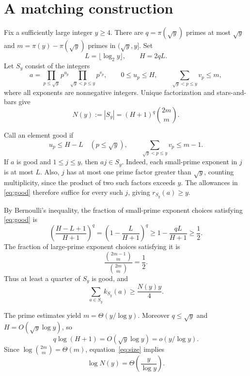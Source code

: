 \documentclass[11pt,a4paper]{article}
\begin{document}
\newpage
\section{A matching construction}

Fix a sufficiently large integer $y\ge4$.
There are $q=\pi(\sqrt y)$ primes at most $\sqrt y$ and $m=\pi(y)-\pi(\sqrt y)$ primes in $(\sqrt y,y]$.
Set
\[
L=\lfloor\log_2 y\rfloor,\qquad H=2qL.
\]
Let $S_y$ consist of the integers
\begin{equation}\label{eq:construction}
a=\prod_{p\le\sqrt y}p^{u_p}\prod_{\sqrt y<p\le y}p^{v_p},
\qquad
0\le u_p\le H,\qquad
\sum_{\sqrt y<p\le y}v_p\le m,
\end{equation}
where all exponents are nonnegative integers.
Unique factorization and stars-and-bars give
\begin{equation}\label{eq:size}
N(y):=|S_y|=(H+1)^q\binom{2m}{m}.
\end{equation}

Call an element good if
\begin{equation}\label{eq:good}
u_p\le H-L\quad(p\le\sqrt y),
\qquad
\sum_{\sqrt y<p\le y}v_p\le m-1.
\end{equation}
If $a$ is good and $1\le j\le y$, then $aj\in S_y$.
Indeed, each small-prime exponent in $j$ is at most $L$.
Also, $j$ has at most one prime factor greater than $\sqrt y$, counting multiplicity, since the product of two such factors exceeds $y$.
The allowances in \eqref{eq:good} therefore suffice for every such $j$, giving $r_{S_y}(a)\ge y$.

By Bernoulli's inequality, the fraction of small-prime exponent choices satisfying \eqref{eq:good} is
\[
\left(\frac{H-L+1}{H+1}\right)^q
=\left(1-\frac{L}{H+1}\right)^q
\ge1-\frac{qL}{H+1}\ge\frac12.
\]
The fraction of large-prime exponent choices satisfying it is
\[
\frac{\binom{2m-1}{m}}{\binom{2m}{m}}=\frac12.
\]
Thus at least a quarter of $S_y$ is good, and
\begin{equation}\label{eq:lower-y}
\sum_{a\in S_y}k_{S_y}(a)\ge\frac{N(y)y}{4}.
\end{equation}

The prime estimates yield $m=\Theta(y/\log y)$.
Moreover $q\le\sqrt y$ and $H=O(\sqrt y\log y)$, so
\[
q\log(H+1)=O(\sqrt y\log y)=o(y/\log y).
\]
Since $\log\binom{2m}{m}=\Theta(m)$, equation~\eqref{eq:size} implies
\begin{equation}\label{eq:asymptotic-size}
\log N(y)=\Theta\!\left(\frac{y}{\log y}\right).
\end{equation}
\end{document}
